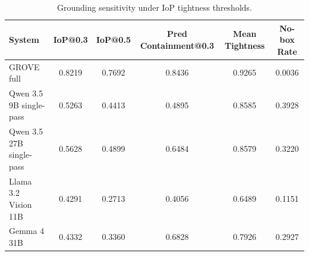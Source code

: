 \begin{table}[t]
\centering
\small
\caption{Grounding sensitivity under IoP tightness thresholds.}
\label{tab:iop\_sensitivity}
\begin{tabular}{lccccc}
\toprule
System & IoP@0.3 & IoP@0.5 & Pred Containment@0.3 & Mean Tightness & No-box Rate \\
\midrule
GROVE full & 0.8219 & 0.7692 & 0.8436 & 0.9265 & 0.0036 \\
Qwen 3.5 9B single-pass & 0.5263 & 0.4413 & 0.4895 & 0.8585 & 0.3928 \\
Qwen 3.5 27B single-pass & 0.5628 & 0.4899 & 0.6484 & 0.8579 & 0.3220 \\
Llama 3.2 Vision 11B & 0.4291 & 0.2713 & 0.4056 & 0.6489 & 0.1151 \\
Gemma 4 31B & 0.4332 & 0.3360 & 0.6828 & 0.7926 & 0.2927 \\
\bottomrule
\end{tabular}
\end{table}
